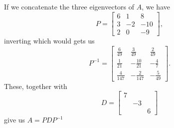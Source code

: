 \documentclass[11pt]{article}
\begin{document}
\subsection{}
If we concatenate the three eigenvectors of $A$, we have
$$P = \begin{bmatrix}6 & 1 & 8\\ 3 & -2 & -10 \\ 2 & 0 & -9\end{bmatrix},$$
inverting which would gets us 
$$P^{-1} = \begin{bmatrix} 
\frac6{49} & \frac3{49} & \frac2{49} \\
\frac{1}{21} & -\frac{10}{21} & -\frac{4}{7} \\
\frac4{147} & -\frac2{147} & -\frac5{49}
\end{bmatrix}. $$
These, together with
$$
D = \begin{bmatrix} 7 \\ & -3 \\ & & 6 \end{bmatrix} 
$$
give us $A = P D P^{-1}$
\end{document}
